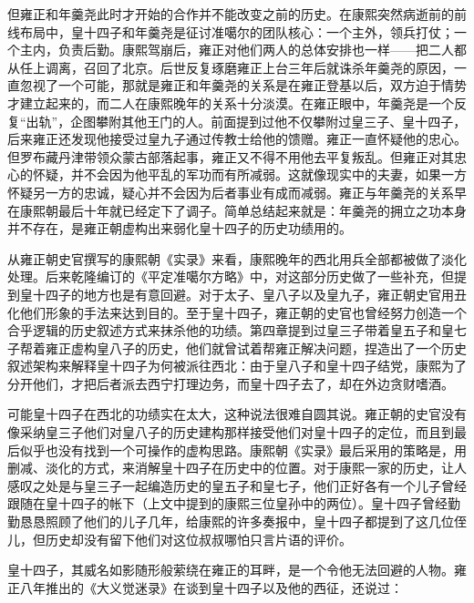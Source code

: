 
但雍正和年羹尧此时才开始的合作并不能改变之前的历史。在康熙突然病逝前的前线布局中，皇十四子和年羹尧是征讨准噶尔的团队核心：一个主外，领兵打仗；一个主内，负责后勤。康熙驾崩后，雍正对他们两人的总体安排也一样——把二人都从任上调离，召回了北京。后世反复琢磨雍正上台三年后就诛杀年羹尧的原因，一直忽视了一个可能，那就是雍正和年羹尧的关系是在雍正登基以后，双方迫于情势才建立起来的，而二人在康熙晚年的关系十分淡漠。在雍正眼中，年羹尧是一个反复“出轨”，企图攀附其他王门的人。前面提到过他不仅攀附过皇三子、皇十四子，后来雍正还发现他接受过皇九子通过传教士给他的馈赠。雍正一直怀疑他的忠心。但罗布藏丹津带领众蒙古部落起事，雍正又不得不用他去平复叛乱。但雍正对其忠心的怀疑，并不会因为他平乱的军功而有所减弱。这就像现实中的夫妻，如果一方怀疑另一方的忠诚，疑心并不会因为后者事业有成而减弱。雍正与年羹尧的关系早在康熙朝最后十年就已经定下了调子。简单总结起来就是：年羹尧的拥立之功本身并不存在，是雍正朝虚构出来弱化皇十四子的历史功绩用的。



从雍正朝史官撰写的康熙朝《实录》来看，康熙晚年的西北用兵全部都被做了淡化处理。后来乾隆编订的《平定准噶尔方略》中，对这部分历史做了一些补充，但提到皇十四子的地方也是有意回避。对于太子、皇八子以及皇九子，雍正朝史官用丑化他们形象的手法来达到目的。至于皇十四子，雍正朝的史官也曾经努力创造一个合乎逻辑的历史叙述方式来抹杀他的功绩。第四章提到过皇三子带着皇五子和皇七子帮着雍正虚构皇八子的历史，他们就曾试着帮雍正解决问题，捏造出了一个历史叙述架构来解释皇十四子为何被派往西北：由于皇八子和皇十四子结党，康熙为了分开他们，才把后者派去西宁打理边务，而皇十四子去了，却在外边贪财嗜酒。



可能皇十四子在西北的功绩实在太大，这种说法很难自圆其说。雍正朝的史官没有像采纳皇三子他们对皇八子的历史建构那样接受他们对皇十四子的定位，而且到最后似乎也没有找到一个可操作的虚构思路。康熙朝《实录》最后采用的策略是，用删减、淡化的方式，来消解皇十四子在历史中的位置。对于康熙一家的历史，让人感叹之处是与皇三子一起编造历史的皇五子和皇七子，他们正好各有一个儿子曾经跟随在皇十四子的帐下（上文中提到的康熙三位皇孙中的两位）。皇十四子曾经勤勤恳恳照顾了他们的儿子几年，给康熙的许多奏报中，皇十四子都提到了这几位侄儿，但历史却没有留下他们对这位叔叔哪怕只言片语的评价。



皇十四子，其威名如影随形般萦绕在雍正的耳畔，是一个令他无法回避的人物。雍正八年推出的《大义觉迷录》在谈到皇十四子以及他的西征，还说过：


